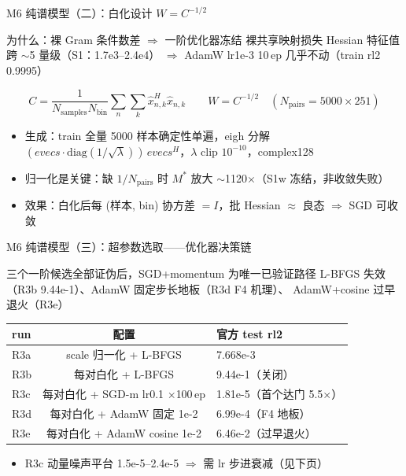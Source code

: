 \documentclass[aspectratio=169]{beamer}
\newcommand{\pos}[1]{\textcolor{blue!70!black}{#1}}
\newcommand{\con}[1]{\textcolor{orange!85!black}{#1}}
\begin{document}
\begin{frame}{M6 纯谱模型（二）：白化设计 $W = C^{-1/2}$}
  \begin{block}{为什么：裸 Gram 条件数差 $\Rightarrow$ 一阶优化器冻结}
    裸共享映射损失 Hessian 特征值跨 \con{$\sim$5 量级}（S1：1.7e3--2.4e4）
    $\Rightarrow$ AdamW lr1e-3 10\,ep 几乎不动（train rl2 0.9995）
  \end{block}
  \begin{equation*}
    C = \frac{1}{N_{\text{samples}} N_{\text{bin}}}
        \sum_{n}\sum_{k} \hat x_{n,k}^{H} \hat x_{n,k}
    \qquad
    W = C^{-1/2} \quad (N_{\text{pairs}} = 5000 \times 251)
  \end{equation*}
  \begin{itemize}
    \item 生成：train 全量 5000 样本\pos{确定性单遍}，eigh 分解 $(evecs \cdot \mathrm{diag}(1/\sqrt{\lambda}))\,evecs^H$，$\lambda$ clip $10^{-10}$，complex128
    \item 归一化是关键：缺 $1/N_{\text{pairs}}$ 时 $M^{*}$ 放大 \con{$\sim$1120$\times$}（S1w 冻结，非收敛失败）
    \item 效果：白化后每 (样本, bin) 协方差 $= I$，批 Hessian $\approx$ 良态 $\Rightarrow$ \pos{SGD 可收敛}
  \end{itemize}
\end{frame}

\begin{frame}{M6 纯谱模型（三）：超参数选取——优化器决策链}
  \begin{block}{三个一阶候选全部证伪后，SGD+momentum 为唯一已验证路径}
    L-BFGS 失效（R3b 9.44e-1）、AdamW 固定步长地板（R3d F4 机理）、
    AdamW+cosine 过早退火（R3e）
  \end{block}
  \begin{table}
    \centering
    \small
    \begin{tabular}{lcl}
      \toprule
      run & 配置 & 官方 test rl2 \\
      \midrule
      R3a & scale 归一化 + L-BFGS & 7.668e-3 \\
      R3b & 每对白化 + L-BFGS & \con{9.44e-1（关闭）} \\
      R3c & 每对白化 + \pos{SGD-m lr0.1} $\times$100\,ep & \pos{1.81e-5（首个达门 5.5$\times$）} \\
      R3d & 每对白化 + AdamW 固定 1e-2 & \con{6.99e-4（F4 地板）} \\
      R3e & 每对白化 + AdamW cosine 1e-2 & \con{6.46e-2（过早退火）} \\
      \bottomrule
    \end{tabular}
  \end{table}
  \begin{itemize}
    \item R3c 动量噪声平台 1.5e-5--2.4e-5 $\Rightarrow$ 需 \pos{lr 步进衰减}（见下页）
  \end{itemize}
\end{frame}
\end{document}
